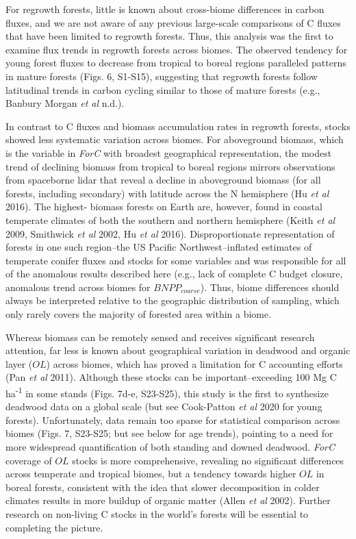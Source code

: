 \documentclass[
]{article}
\begin{document}
For regrowth forests, little is known about cross-biome differences in
carbon fluxes, and we are not aware of any previous large-scale
comparisons of C fluxes that have been limited to regrowth forests.
Thus, this analysis was the first to examine flux trends in regrowth
forests across biomes. The observed tendency for young forest fluxes to
decrease from tropical to boreal regions paralleled patterns in mature
forests (Figs. 6, S1-S15), suggesting that regrowth forests follow
latitudinal trends in carbon cycling similar to those of mature forests
(e.g., Banbury Morgan \emph{et al} n.d.).

In contrast to C fluxes and biomass accumulation rates in regrowth
forests, stocks showed less systematic variation across biomes. For
aboveground biomass, which is the variable in \emph{ForC} with broadest
geographical representation, the modest trend of declining biomass from
tropical to boreal regions mirrors observations from spaceborne lidar
that reveal a decline in aboveground biomass (for all forests, including
secondary) with latitude across the N hemisphere (Hu \emph{et al} 2016).
The highest- biomass forests on Earth are, however, found in coastal
temperate climates of both the southern and northern hemisphere (Keith
\emph{et al} 2009, Smithwick \emph{et al} 2002, Hu \emph{et al} 2016).
Disproportionate representation of forests in one such region--the US
Pacific Northwest--inflated estimates of temperate conifer fluxes and
stocks for some variables and was responsible for all of the anomalous
results described here (e.g., lack of complete C budget closure,
anomalous trend across biomes for \(BNPP_{coarse}\)). Thus, biome
differences should always be interpreted relative to the geographic
distribution of sampling, which only rarely covers the majority of
forested area within a biome.

Whereas biomass can be remotely sensed and receives significant research
attention, far less is known about geographical variation in deadwood
and organic layer (\(OL\)) across biomes, which has proved a limitation
for C accounting efforts (Pan \emph{et al} 2011). Although these stocks
can be important--exceeding 100 Mg C ha\textsuperscript{-1} in some
stands (Figs. 7d-e, S23-S25), this study is the first to synthesize
deadwood data on a global scale (but see Cook-Patton \emph{et al} 2020
for young forests). Unfortunately, data remain too sparse for
statistical comparison across biomes (Figs. 7, S23-S25; but see below
for age trends), pointing to a need for more widespread quantification
of both standing and downed deadwood. \emph{ForC} coverage of \(OL\)
stocks is more comprehensive, revealing no significant differences
across temperate and tropical biomes, but a tendency towards higher
\(OL\) in boreal forests, consistent with the idea that slower
decomposition in colder climates results in more buildup of organic
matter (Allen \emph{et al} 2002). Further research on non-living C
stocks in the world's forests will be essential to completing the
picture.
\end{document}
